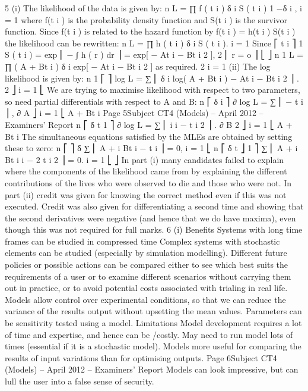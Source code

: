 5
(i)
The likelihood of the data is given by:
n
L = ∏ f ( t i ) δ i S ( t i ) 1 −δ i ,
i = 1
where f(t i ) is the probability density function and S(t i ) is the survivor function.
Since f(t i ) is related to the hazard function by
f(t i ) = h(t i ) S(t i )
the likelihood can be rewritten:
n
L = ∏ h ( t i ) δ i S ( t i ).
i = 1
Since
⎡ t i
⎤
1
S ( t i ) = exp ⎢ − ∫ h ( r ) dr ⎥ = exp[ − At i − Bt i 2 ],
2
⎢ r = o
⎥
⎣
⎦
n
1
L = ∏ ( A + Bt i ) δ i exp[ − At i − Bt i 2 ] as required.
2
i = 1
(ii)
The log likelihood is given by:
n
1
⎡
⎤
log L = ∑ ⎢ δ i log( A + Bt i ) − At i − Bt i 2 ⎥ .
2
⎦
i = 1 ⎣
We are trying to maximise likelihood with respect to two parameters,
so need partial differentials with respect to A and B:
n
⎡ δ i
⎤
∂
log L = ∑ ⎢
− t i ⎥ ,
∂ A
⎦
i = 1 ⎣ A + Bt i
Page 5Subject CT4 (Models) – April 2012 – Examiners’ Report
n
⎡ δ t
1 ⎤
∂
log L = ∑ ⎢ i i − t i 2 ⎥ .
∂ B
2 ⎦
i = 1 ⎣ A + Bt i
The simultaneous equations satisfied by the MLEs are obtained by
setting these to zero:
n
⎡
⎤
δ
∑ ⎢ A + i Bt i − t i ⎥ = 0,
i = 1 ⎣
n
⎡ δ t
⎦
1
⎤
∑ ⎢ A + i Bt i i − 2 t i 2 ⎥ = 0.
i = 1 ⎣
⎦
In part (i) many candidates failed to explain where the components of the likelihood came
from by explaining the different contributions of the lives who were observed to die and those
who were not. In part (ii) credit was given for knowing the correct method even if this was
not executed. Credit was also given for differentiating a second time and showing that the
second derivatives were negative (and hence that we do have maxima), even though this was
not required for full marks.
6
(i)
Benefits
Systems with long time frames can be studied in compressed time
Complex systems with stochastic elements can be studied (especially by
simulation modelling).
Different future policies or possible actions can be compared either to see which best
suits the requirements of a user or to examine different scenarios without carrying
them out in practice, or to avoid potential costs associated with trialing in real life.
Models allow control over experimental conditions, so that we can reduce the
variance of the results output without upsetting the mean values.
Parameters can be sensitivity tested using a model.
Limitations
Model development requires a lot of time and expertise, and hence can be /costly.
May need to run model lots of times (essential if it is a stochastic model).
Models more useful for comparing the results of input variations than for
optimising outputs.
Page 6Subject CT4 (Models) – April 2012 – Examiners’ Report
Models can look impressive, but can lull the user into a false sense of security.
